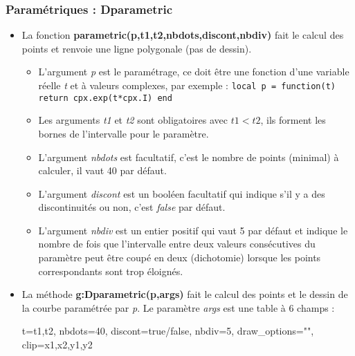 \subsubsection{Paramétriques : Dparametric}

\begin{itemize}
\item La fonction \textbf{parametric(p,t1,t2,nbdots,discont,nbdiv)} fait le calcul des points et renvoie une ligne polygonale (pas de dessin).
  \begin{itemize}
    \item L'argument \emph{p} est le paramétrage, ce doit être une fonction d'une variable réelle \emph{t} et à valeurs complexes, par exemple :
    \texttt{local p = function(t) return cpx.exp(t*cpx.I) end}
    \item  Les arguments \emph{t1} et \emph{t2} sont obligatoires avec \(t1 < t2\), ils forment les bornes de l'intervalle pour le paramètre.
    \item L'argument \emph{nbdots} est facultatif, c'est le nombre de points (minimal) à calculer, il vaut 40 par défaut.
    \item L'argument \emph{discont} est un booléen facultatif qui indique s'il y a des discontinuités ou non, c'est \emph{false} par défaut.
    \item L'argument \emph{nbdiv} est un entier positif qui vaut 5 par défaut et indique le nombre de fois que l'intervalle entre deux valeurs consécutives du paramètre peut être coupé en deux (dichotomie) lorsque les points correspondants sont trop éloignés.
  \end{itemize}
  
\item La méthode \textbf{g:Dparametric(p,args)} fait le calcul des points et le dessin de la courbe paramétrée par \emph{p}. Le paramètre \emph{args} est une table à 6 champs :

\begin{TeXcode}
 { t={t1,t2}, nbdots=40, discont=true/false, nbdiv=5, draw_options="", clip={x1,x2,y1,y2} }
\end{TeXcode}


\end{itemize}
